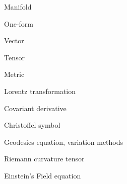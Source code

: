 \documentclass{article}
\begin{document}
\begin{multicols}{2}

Manifold

One-form

Vector

Tensor

Metric

Lorentz transformation

Covariant derivative

Christoffel symbol

Geodesics equation, variation methods

Riemann curvature tensor

Einstein's Field equation


\end{multicols}
\end{document}

